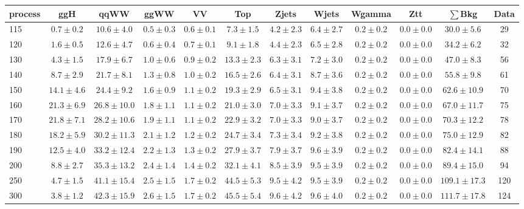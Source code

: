 \begin{table}
{\footnotesize
 \begin{center}
 \begin{tabular}{l c c c c c c c c c c c }
 \hline
 process & ggH & qqWW & ggWW & VV & Top & Zjets & Wjets & Wgamma & Ztt & $\sum$Bkg & Data \\
 \hline
115 & $0.7\pm0.2$ & $10.6\pm4.0$ & $0.5\pm0.3$ & $0.6\pm0.1$ & $7.3\pm1.5$ & $4.2\pm2.3$ & $6.4\pm2.7$ & $0.2\pm0.2$ & $0.0\pm0.0$ & $30.0\pm5.6$ & 29 \\
120 & $1.6\pm0.5$ & $12.6\pm4.7$ & $0.6\pm0.4$ & $0.7\pm0.1$ & $9.1\pm1.8$ & $4.4\pm2.3$ & $6.5\pm2.8$ & $0.2\pm0.2$ & $0.0\pm0.0$ & $34.2\pm6.2$ & 32 \\
130 & $4.3\pm1.5$ & $17.9\pm6.7$ & $1.0\pm0.6$ & $0.9\pm0.2$ & $13.3\pm2.3$ & $6.3\pm3.1$ & $7.2\pm3.0$ & $0.2\pm0.2$ & $0.0\pm0.0$ & $47.0\pm8.3$ & 56 \\
140 & $8.7\pm2.9$ & $21.7\pm8.1$ & $1.3\pm0.8$ & $1.0\pm0.2$ & $16.5\pm2.6$ & $6.4\pm3.1$ & $8.7\pm3.6$ & $0.2\pm0.2$ & $0.0\pm0.0$ & $55.8\pm9.8$ & 61 \\
150 & $14.1\pm4.6$ & $24.4\pm9.2$ & $1.6\pm0.9$ & $1.1\pm0.2$ & $19.3\pm2.9$ & $6.5\pm3.1$ & $9.4\pm3.8$ & $0.2\pm0.2$ & $0.0\pm0.0$ & $62.6\pm10.9$ & 70 \\
160 & $21.3\pm6.9$ & $26.8\pm10.0$ & $1.8\pm1.1$ & $1.1\pm0.2$ & $21.0\pm3.0$ & $7.0\pm3.3$ & $9.1\pm3.7$ & $0.2\pm0.2$ & $0.0\pm0.0$ & $67.0\pm11.7$ & 75 \\
170 & $21.8\pm7.1$ & $28.2\pm10.6$ & $1.9\pm1.1$ & $1.1\pm0.2$ & $22.9\pm3.2$ & $7.0\pm3.3$ & $9.0\pm3.7$ & $0.2\pm0.2$ & $0.0\pm0.0$ & $70.3\pm12.2$ & 78 \\
180 & $18.2\pm5.9$ & $30.2\pm11.3$ & $2.1\pm1.2$ & $1.2\pm0.2$ & $24.7\pm3.4$ & $7.3\pm3.4$ & $9.2\pm3.8$ & $0.2\pm0.2$ & $0.0\pm0.0$ & $75.0\pm12.9$ & 82 \\
190 & $12.5\pm4.0$ & $33.2\pm12.4$ & $2.2\pm1.3$ & $1.3\pm0.2$ & $27.9\pm3.7$ & $7.9\pm3.7$ & $9.6\pm3.9$ & $0.2\pm0.2$ & $0.0\pm0.0$ & $82.4\pm14.1$ & 88 \\
200 & $8.8\pm2.7$ & $35.3\pm13.2$ & $2.4\pm1.4$ & $1.4\pm0.2$ & $32.1\pm4.1$ & $8.5\pm3.9$ & $9.5\pm3.9$ & $0.2\pm0.2$ & $0.0\pm0.0$ & $89.4\pm15.0$ & 94 \\
250 & $4.7\pm1.5$ & $41.1\pm15.4$ & $2.5\pm1.5$ & $1.7\pm0.2$ & $44.5\pm5.3$ & $9.5\pm4.2$ & $9.5\pm3.9$ & $0.2\pm0.2$ & $0.0\pm0.0$ & $109.1\pm17.3$ & 120 \\
300 & $3.8\pm1.2$ & $42.3\pm15.9$ & $2.6\pm1.5$ & $1.7\pm0.2$ & $45.5\pm5.4$ & $9.6\pm4.2$ & $9.6\pm4.0$ & $0.2\pm0.2$ & $0.0\pm0.0$ & $111.7\pm17.8$ & 124 \\

\end{tabular}
\end{center}}
\end{table}
